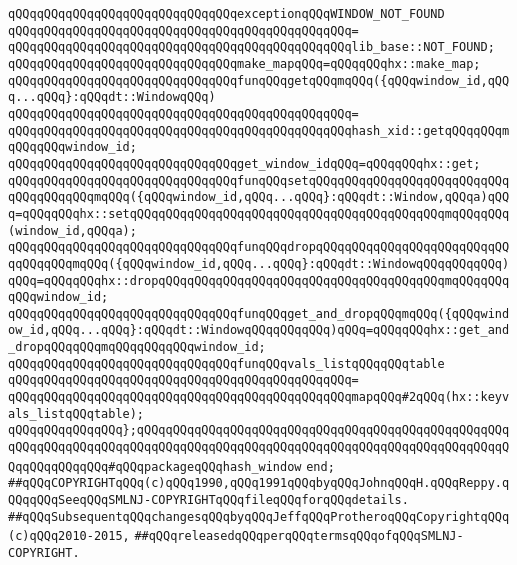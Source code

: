 \newline
\verb|qQQqqQQqqQQqqQQqqQQqqQQqqQQqqQQqexceptionqQQqWINDOW_NOT_FOUND|\newline
\verb|qQQqqQQqqQQqqQQqqQQqqQQqqQQqqQQqqQQqqQQqqQQqqQQq=|\newline
\verb|qQQqqQQqqQQqqQQqqQQqqQQqqQQqqQQqqQQqqQQqqQQqqQQqlib_base::NOT_FOUND;|\newline
\newline
\verb|qQQqqQQqqQQqqQQqqQQqqQQqqQQqqQQqmake_mapqQQq=qQQqqQQqhx::make_map;|\newline
\newline
\verb|qQQqqQQqqQQqqQQqqQQqqQQqqQQqqQQqfunqQQqgetqQQqmqQQq({qQQqwindow_id,qQQq...qQQq}:qQQqdt::WindowqQQq)|\newline
\verb|qQQqqQQqqQQqqQQqqQQqqQQqqQQqqQQqqQQqqQQqqQQqqQQq=|\newline
\verb|qQQqqQQqqQQqqQQqqQQqqQQqqQQqqQQqqQQqqQQqqQQqqQQqhash_xid::getqQQqqQQqmqQQqqQQqwindow_id;|\newline
\newline
\verb|qQQqqQQqqQQqqQQqqQQqqQQqqQQqqQQqget_window_idqQQq=qQQqqQQqhx::get;|\newline
\newline
\verb|qQQqqQQqqQQqqQQqqQQqqQQqqQQqqQQqfunqQQqsetqQQqqQQqqQQqqQQqqQQqqQQqqQQqqQQqqQQqqQQqmqQQq({qQQqwindow_id,qQQq...qQQq}:qQQqdt::Window,qQQqa)qQQq=qQQqqQQqhx::setqQQqqQQqqQQqqQQqqQQqqQQqqQQqqQQqqQQqqQQqqQQqmqQQqqQQq(window_id,qQQqa);|\newline
\verb|qQQqqQQqqQQqqQQqqQQqqQQqqQQqqQQqfunqQQqdropqQQqqQQqqQQqqQQqqQQqqQQqqQQqqQQqqQQqmqQQq({qQQqwindow_id,qQQq...qQQq}:qQQqdt::WindowqQQqqQQqqQQq)qQQq=qQQqqQQqhx::dropqQQqqQQqqQQqqQQqqQQqqQQqqQQqqQQqqQQqqQQqmqQQqqQQqqQQqwindow_id;|\newline
\verb|qQQqqQQqqQQqqQQqqQQqqQQqqQQqqQQqfunqQQqget_and_dropqQQqmqQQq({qQQqwindow_id,qQQq...qQQq}:qQQqdt::WindowqQQqqQQqqQQq)qQQq=qQQqqQQqhx::get_and_dropqQQqqQQqmqQQqqQQqqQQqwindow_id;|\newline
\newline
\verb|qQQqqQQqqQQqqQQqqQQqqQQqqQQqqQQqfunqQQqvals_listqQQqqQQqtable|\newline
\verb|qQQqqQQqqQQqqQQqqQQqqQQqqQQqqQQqqQQqqQQqqQQqqQQq=|\newline
\verb|qQQqqQQqqQQqqQQqqQQqqQQqqQQqqQQqqQQqqQQqqQQqqQQqmapqQQq#2qQQq(hx::keyvals_listqQQqtable);|\newline
\newline
\verb|qQQqqQQqqQQqqQQq};qQQqqQQqqQQqqQQqqQQqqQQqqQQqqQQqqQQqqQQqqQQqqQQqqQQqqQQqqQQqqQQqqQQqqQQqqQQqqQQqqQQqqQQqqQQqqQQqqQQqqQQqqQQqqQQqqQQqqQQqqQQqqQQqqQQqqQQq#qQQqpackageqQQqhash_window|\newline
\verb|end;|\newline
\newline
\verb|##qQQqCOPYRIGHTqQQq(c)qQQq1990,qQQq1991qQQqbyqQQqJohnqQQqH.qQQqReppy.qQQqqQQqSeeqQQqSMLNJ-COPYRIGHTqQQqfileqQQqforqQQqdetails.|\newline
\verb|##qQQqSubsequentqQQqchangesqQQqbyqQQqJeffqQQqProtheroqQQqCopyrightqQQq(c)qQQq2010-2015,|\newline
\verb|##qQQqreleasedqQQqperqQQqtermsqQQqofqQQqSMLNJ-COPYRIGHT.|\newline


